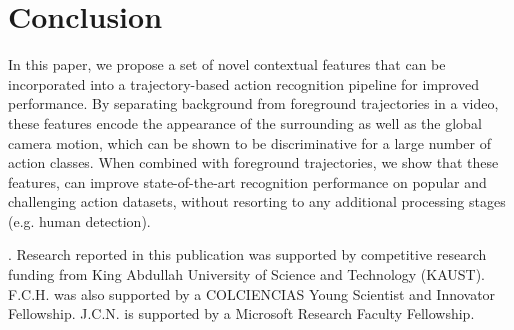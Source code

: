 \documentclass[runningheads]{llncs}
\begin{document}
\section{Conclusion}
In this paper, we propose a set of novel contextual features that can be incorporated into a trajectory-based action recognition pipeline for improved performance. By separating background from foreground trajectories in a video, these features encode the appearance of the surrounding as well as the global camera motion, which can be shown to be discriminative for a large number of action classes. When combined with foreground trajectories, we show that these features, can improve state-of-the-art recognition performance on popular and challenging action datasets, without resorting to any additional processing stages (e.g. human detection). 

\vspace{3mm}
. Research reported in this publication was supported by competitive research funding from King Abdullah University of Science and Technology (KAUST). F.C.H. was also supported by a COLCIENCIAS Young  Scientist and Innovator Fellowship. J.C.N. is supported by a Microsoft Research Faculty Fellowship.


\end{document}
